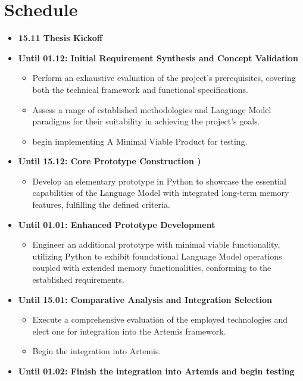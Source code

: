\documentclass[a4paper,12pt,twoside]{article}
\begin{document}
\section{Schedule}
\begin{itemize}
    \item \textbf{15.11 Thesis Kickoff}
    \item \textbf{Until 01.12: Initial Requirement Synthesis and Concept Validation}
    \begin{itemize}
        \item Perform an exhaustive evaluation of the project's prerequisites, covering both the technical framework and functional specifications.
        \item Assess a range of established methodologies and Language Model paradigms for their suitability in achieving the project’s goals.
        \item begin implementing A Minimal Viable Product for testing.
    \end{itemize}
    \item \textbf{Until 15.12: Core Prototype Construction )}
    \begin{itemize}
        \item Develop an elementary prototype in Python to showcase the essential capabilities of the Language Model with integrated long-term memory features, fulfilling the defined criteria.
    \end{itemize}
    \item \textbf{Until 01.01: Enhanced Prototype Development}
    \begin{itemize}
        \item Engineer an additional prototype with minimal viable functionality, utilizing Python to exhibit foundational Language Model operations coupled with extended memory functionalities, conforming to the established requirements.
    \end{itemize}
    \item \textbf{Until 15.01: Comparative Analysis and Integration Selection}
    \begin{itemize}
        \item Execute a comprehensive evaluation of the employed technologies and elect one for integration into the Artemis framework.
        \item Begin the integration into Artemis.
    \end{itemize}
    \item \textbf{Until 01.02: Finish the integration into Artemis and begin testing}

\end{itemize}
\end{document}
